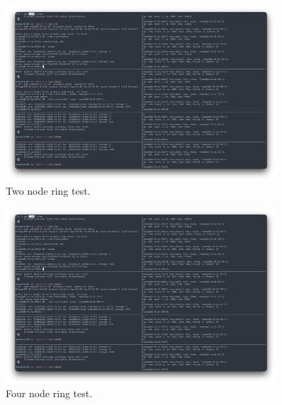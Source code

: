 \documentclass[a4paper, 11pt]{article}
\begin{document}
\begin{figure}[H]
  \centering
  \includegraphics[width=0.9\textwidth]{screenshots/dual.png}
  \caption{Two node ring test.}
  \label{fig:test2}
\end{figure}

\begin{figure}[H]
  \centering
  \includegraphics[width=0.9\textwidth]{screenshots/dual.png}
  \caption{Four node ring test.}
  \label{fig:test3}
\end{figure}
\end{document}
